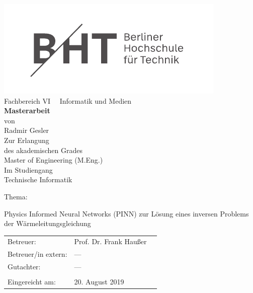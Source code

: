 \documentclass[bachelor,german]{hgbthesis}
\begin{document}
\frontmatter %
\thispagestyle{empty}
\begin{centering}
	
	\includegraphics[width=.5\linewidth]{bht_logos/BHT_Logo_kompakt_horizontal_Anthrazit_transparent}\\
	\vspace*{60pt}
	Fachbereich VI \ \ Informatik und Medien\\
	\vspace*{30pt}
	\textbf{Masterarbeit}\\
	\vspace*{40pt}
	von\\
	\vspace*{20pt}
	Radmir Gesler\\
	\vspace*{30pt}
	Zur Erlangung \\
	des akademischen Grades\\
	Master of Engineering (M.Eng.)\\
	\vspace*{40pt}
	Im Studiengang\\
	Technische Informatik
	
\end{centering}
\vspace*{40pt}
Thema: 
\begin{center}
	Physics Informed Neural Networks (PINN) zur Lösung eines inversen Problems der Wärmeleitungsgleichung
\end{center}

\vspace*{40pt}
\begin{tabular}{l l  p{4pt}}
	Betreuer: & Prof. Dr. Frank Haußer  \\
	Betreuer/in extern: & ---\\
	Gutachter: & ---  \\
	\\
	Eingereicht am: & 20. August 2019 \\
\end{tabular}

\end{document}
